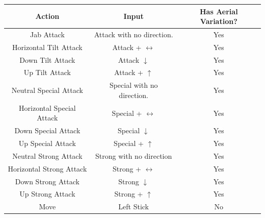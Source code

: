 \begin{table}[h!]
\centering
\begin{tabular}{ | c | c | c | }
    \hline
    \textbf{Action} & \textbf{Input} & \textbf{Has Aerial Variation?} \\
    \hline
    Jab Attack                                                           & Attack with no direction.            & Yes                   \\
    \hline
    Horizontal Tilt Attack   & Attack + $\leftrightarrow$  & Yes                   \\
    \hline
    Down Tilt Attack                                                     & Attack $\downarrow$                           & Yes                   \\
    \hline
    Up Tilt Attack                                                       & Attack + $\uparrow$          & Yes                   \\
    \hline
    Neutral Special Attack                                               & Special with no direction.           & Yes                   \\
    \hline
    Horizontal Special Attack & Special + $\leftrightarrow$ & Yes                   \\
    \hline
    Down Special Attack                                                  & Special $\downarrow$                          & Yes                   \\
    \hline
    Up Special Attack                                                    & Special + $\uparrow$         & Yes                   \\
    \hline
    Neutral Strong Attack                                                & Strong with no direction             & Yes                   \\
    \hline
    Horizontal Strong Attack                                             & Strong + $\leftrightarrow$  & Yes                   \\
    \hline
    Down Strong Attack                                                   & Strong $\downarrow$                           & Yes                   \\
    \hline
    Up Strong Attack                                                     & Strong + $\uparrow$          & Yes                   \\
    \hline
    Move                                                                 & Left Stick                           & No                    \\

\end{tabular}
\end{table}
